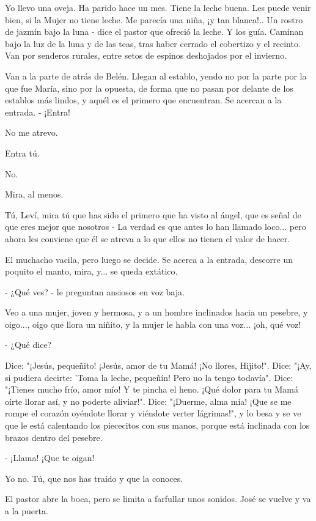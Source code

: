 \documentclass[12pt, twoside, openright]{book} %
\begin{document}
Yo llevo una oveja. Ha parido hace un mes. Tiene la leche buena. Les puede venir bien, si la Mujer no tiene leche. Me parecía una niña, ¡y tan blanca!.. Un rostro de jazmín bajo la luna - dice el pastor que ofreció la leche. Y los guía. Caminan bajo la luz de la luna y de las teas, tras haber cerrado el cobertizo y el recinto. Van por senderos rurales, entre setos de espinos deshojados por el invierno. 

Van a la parte de atrás de Belén. Llegan al establo, yendo no por la parte por la que fue María, sino por la opuesta, de forma que no pasan por delante de los establos más lindos, y aquél es el primero que encuentran. Se acercan a la entrada. - ¡Entra! 

No me atrevo. 

Entra tú. 

No. 

Mira, al menos. 

Tú, Leví, mira tú que has sido el primero que ha visto al ángel, que es señal de que eres mejor que nosotros - La verdad es que antes lo han llamado loco... pero ahora les conviene que él se atreva a lo que ellos no tienen el valor de hacer. 

El muchacho vacila, pero luego se decide. Se acerca a la entrada, descorre un poquito el manto, mira, y... se queda extático. 

- ¿Qué ves? - le preguntan ansiosos en voz baja. 

Veo a una mujer, joven y hermosa, y a un hombre inclinados hacia un pesebre, y oigo..., oigo que llora un niñito, y la mujer le habla con una voz... ¡oh, qué voz! 

- ¿Qué dice? 

Dice: "¡Jesús, pequeñito! ¡Jesús, amor de tu Mamá! ¡No llores, Hijito!". Dice: "¡Ay, si pudiera decirte: 'Toma la leche, pequeñín! Pero no la tengo todavía". Dice: "¡Tienes mucho frío, amor mío! Y te pincha el heno. ¡Qué dolor para tu Mamá oírte llorar así, y no poderte aliviar!". Dice: "¡Duerme, alma mía! ¡Que se me rompe el corazón oyéndote llorar y viéndote verter lágrimas!", y lo besa y se ve que le está calentando los piececitos con sus manos, porque está inclinada con los brazos dentro del pesebre. 

- ¡Llama! ¡Que te oigan! 

Yo no. Tú, que nos has traído y que la conoces. 

El pastor abre la boca, pero se limita a farfullar unos sonidos. José se vuelve y va a la puerta. 
\end{document}
